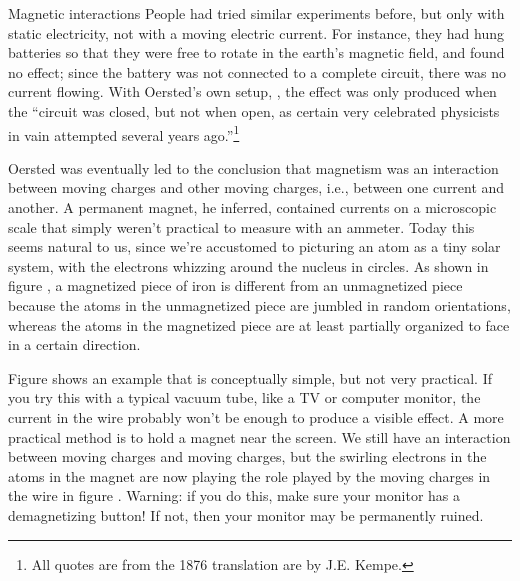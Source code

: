 \begin{envsubsection}{Magnetic interactions}
People had tried similar experiments before, but only with static electricity, not with
a moving electric current. For instance, they had hung batteries so that they were free to
rotate in the earth's magnetic field, and found no effect; since the battery was not connected
to a complete circuit, there was no current flowing. With Oersted's own setup, ,
the effect was only produced when the ``circuit was closed, but not
when open, as certain very celebrated physicists in vain attempted several years ago.''\footnote{All
quotes are from the 1876 translation are by J.E. Kempe.}

Oersted was eventually
led to the conclusion that magnetism was an interaction between moving charges and
other moving charges, i.e., between one current and another.  
A permanent magnet, he inferred, contained currents on a microscopic
scale that simply weren't practical to measure with an ammeter. Today this seems natural
to us, since we're accustomed to picturing an atom as a tiny solar system, with the electrons
whizzing around the nucleus in circles. As shown in figure ,
a magnetized piece of iron is different from an
unmagnetized piece because the atoms in the unmagnetized piece are jumbled in random
orientations, whereas the atoms in the magnetized piece are at least partially organized
to face in a certain direction.

Figure  shows an example that is conceptually
simple, but not very practical. If you try this with a typical vacuum tube, like a TV
or computer monitor, the current in the wire probably won't be enough to produce a visible
effect. A more practical method is to hold a magnet near the screen. We still have
an interaction between moving charges and moving charges, but the swirling electrons
in the atoms in the magnet are now playing the role played by the moving charges in the wire
in figure . Warning: if you do this, make sure your monitor has a
demagnetizing button! If not, then your monitor may be permanently ruined.
\end{envsubsection}
